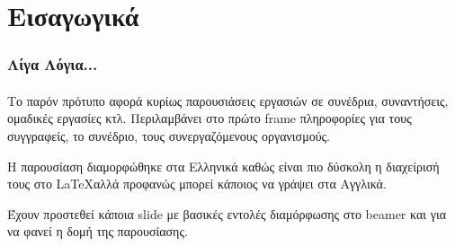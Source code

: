 \section{Εισαγωγικά}
 

\begin{frame}\frametitle{Λίγα Λόγια...}\framesubtitle{}
Το παρόν πρότυπο αφορά κυρίως παρουσιάσεις εργασιών σε συνέδρια, συναντήσεις, ομαδικές εργασίες κτλ. Περιλαμβάνει στο πρώτο frame πληροφορίες για τους συγγραφείς, το συνέδριο, τους συνεργαζόμενους οργανισμούς.

Η παρουσίαση διαμορφώθηκε στα Ελληνικά καθώς είναι πιο δύσκολη η διαχείρισή τους στο \LaTeX  αλλά προφανώς μπορεί κάποιος να γράψει στα Αγγλικά. 

Έχουν προστεθεί κάποια slide με βασικές εντολές διαμόρφωσης στο beamer και για να φανεί η δομή της παρουσίασης.

\end{frame}
